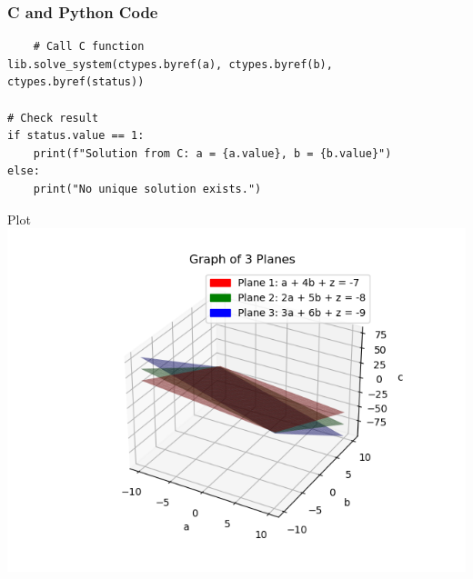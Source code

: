 \documentclass{beamer}
\begin{document}
\begin{frame}[fragile]
\frametitle{C and Python Code}
\begin{lstlisting}
    # Call C function
lib.solve_system(ctypes.byref(a), ctypes.byref(b), ctypes.byref(status))

# Check result
if status.value == 1:
    print(f"Solution from C: a = {a.value}, b = {b.value}")
else:
    print("No unique solution exists.")
\end{lstlisting}
\end{frame}
\begin{frame}{Plot}
    \centering
    \includegraphics[width=\columnwidth, height=0.8\textheight, keepaspectratio]{Figure_13.png}     
\end{frame}
\end{document}
